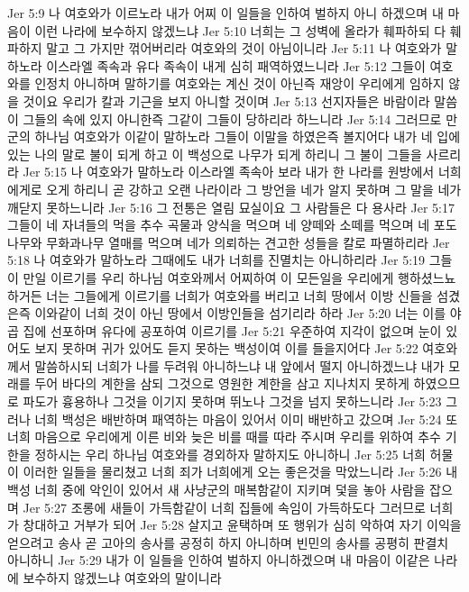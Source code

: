 Jer 5:9  나 여호와가 이르노라 내가 어찌 이 일들을 인하여 벌하지 아니 하겠으며 내 마음이 이런 나라에 보수하지 않겠느냐
Jer 5:10  너희는 그 성벽에 올라가 훼파하되 다 훼파하지 말고 그 가지만 꺾어버리라 여호와의 것이 아님이니라
Jer 5:11  나 여호와가 말하노라 이스라엘 족속과 유다 족속이 내게 심히 패역하였느니라
Jer 5:12  그들이 여호와를 인정치 아니하며 말하기를 여호와는 계신 것이 아닌즉 재앙이 우리에게 임하지 않을 것이요 우리가 칼과 기근을 보지 아니할 것이며
Jer 5:13  선지자들은 바람이라 말씀이 그들의 속에 있지 아니한즉 그같이 그들이 당하리라 하느니라
Jer 5:14  그러므로 만군의 하나님 여호와가 이같이 말하노라 그들이 이말을 하였은즉 볼지어다 내가 네 입에 있는 나의 말로 불이 되게 하고 이 백성으로 나무가 되게 하리니 그 불이 그들을 사르리라
Jer 5:15  나 여호와가 말하노라 이스라엘 족속아 보라 내가 한 나라를 원방에서 너희에게로 오게 하리니 곧 강하고 오랜 나라이라 그 방언을 네가 알지 못하며 그 말을 네가 깨닫지 못하느니라
Jer 5:16  그 전통은 열림 묘실이요 그 사람들은 다 용사라
Jer 5:17  그들이 네 자녀들의 먹을 추수 곡물과 양식을 먹으며 네 양떼와 소떼를 먹으며 네 포도나무와 무화과나무 열매를 먹으며 네가 의뢰하는 견고한 성들을 칼로 파멸하리라
Jer 5:18  나 여호와가 말하노라 그때에도 내가 너희를 진멸치는 아니하리라
Jer 5:19  그들이 만일 이르기를 우리 하나님 여호와께서 어찌하여 이 모든일을 우리에게 행하셨느뇨 하거든 너는 그들에게 이르기를 너희가 여호와를 버리고 너희 땅에서 이방 신들을 섬겼은즉 이와같이 너희 것이 아닌 땅에서 이방인들을 섬기리라 하라
Jer 5:20  너는 이를 야곱 집에 선포하며 유다에 공포하여 이르기를
Jer 5:21  우준하여 지각이 없으며 눈이 있어도 보지 못하며 귀가 있어도 듣지 못하는 백성이여 이를 들을지어다
Jer 5:22  여호와께서 말씀하시되 너희가 나를 두려워 아니하느냐 내 앞에서 떨지 아니하겠느냐 내가 모래를 두어 바다의 계한을 삼되 그것으로 영원한 계한을 삼고 지나치지 못하게 하였으므로 파도가 흉용하나 그것을 이기지 못하며 뛰노나 그것을 넘지 못하느니라
Jer 5:23  그러나 너희 백성은 배반하며 패역하는 마음이 있어서 이미 배반하고 갔으며
Jer 5:24  또 너희 마음으로 우리에게 이른 비와 늦은 비를 때를 따라 주시며 우리를 위하여 추수 기한을 정하시는 우리 하나님 여호와를 경외하자 말하지도 아니하니
Jer 5:25  너희 허물이 이러한 일들을 물리쳤고 너희 죄가 너희에게 오는 좋은것을 막았느니라
Jer 5:26  내 백성 너희 중에 악인이 있어서 새 사냥군의 매복함같이 지키며 덫을 놓아 사람을 잡으며
Jer 5:27  조롱에 새들이 가득함같이 너희 집들에 속임이 가득하도다 그러므로 너희가 창대하고 거부가 되어
Jer 5:28  살지고 윤택하며 또 행위가 심히 악하여 자기 이익을 얻으려고 송사 곧 고아의 송사를 공정히 하지 아니하며 빈민의 송사를 공평히 판결치 아니하니
Jer 5:29  내가 이 일들을 인하여 벌하지 아니하겠으며 내 마음이 이같은 나라에 보수하지 않겠느냐 여호와의 말이니라
